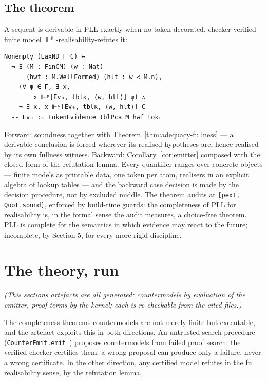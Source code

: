 \subsection{The theorem}\label{63-the-theorem}

\begin{theorem}\label{thm:crown}
A sequent is derivable in PLL exactly
when no token-decorated, checker-verified finite model
\ensuremath{\Vdash^{\mathrm{p}}}-realisability-refutes it:

\begin{lstlisting}
Nonempty (LaxND Γ C) ↔
  ¬ ∃ (M : FinCM) (w : Nat)
      (hwf : M.WellFormed) (hlt : w < M.n),
    (∀ ψ ∈ Γ, ∃ x,
        x ⊩ᵖ[Ev₀, tblκ, ⟨w, hlt⟩] ψ) ∧
    ¬ ∃ x, x ⊩ᵖ[Ev₀, tblκ, ⟨w, hlt⟩] C
  -- Ev₀ := tokenEvidence tblPca M hwf tok₀
\end{lstlisting}
\end{theorem}

Forward: soundness together with Theorem~\ref{thm:adequacy-fullness} --- a derivable conclusion
is forced wherever its realised hypotheses are, hence realised by its
own fullness witness. Backward: Corollary~\ref{cor:emitter} composed
with the closed form of the refutation lemma. Every quantifier ranges over concrete objects --- finite models
as printable data, one token per atom, realisers in an explicit algebra
of lookup tables --- and the backward case decision is made by the
decision procedure, not by excluded middle. The theorem audits at
\texttt{[pext, Quot.sound]}, enforced by build-time guards: the
completeness of PLL for realisability is, in the formal sense the audit
measures, a choice-free theorem. PLL is complete for the semantics in
which evidence may react to the future; incomplete, by Section 5, for
every more rigid discipline.

\section{The theory, run}\label{7-the-theory-run}

\emph{(This section\textquotesingle s artefacts are all generated: countermodels by
evaluation of the emitter, proof terms by the kernel; each is
re-checkable from the cited files.)}

The completeness theorem\textquotesingle s countermodels are not merely finite but
executable, and the artefact exploits this in both directions. An
untrusted search procedure (\texttt{CounterEmit.emit}~) proposes countermodels
from failed proof search; the verified checker certifies them; a wrong
proposal can produce only a failure, never a wrong certificate. In the
other direction, any certified model refutes in the full realisability
sense, by the refutation lemma.

